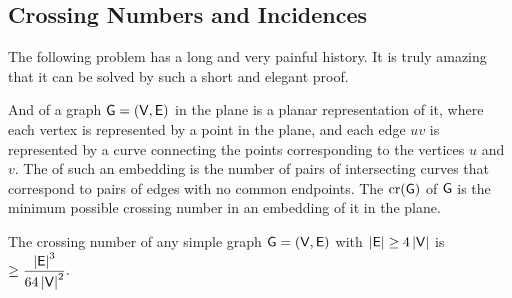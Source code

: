 \subsection{Crossing Numbers and Incidences}

The following problem has a long and very painful
history. It is truly amazing that it can be solved by such a
short and elegant proof. 

And  of a graph $\mathsf{G} = (\mathsf{V}, \mathsf{E})$ in the
plane is a planar representation of it, where each vertex is
represented by a point in the plane, and each edge $u v$ is
represented by a curve connecting the points corresponding to the
vertices $u$ and $v$. The  of such an embedding
is the number of pairs of intersecting curves that correspond to pairs
of edges with no common endpoints. The 
$\mathop{\mathrm{cr}}(\mathsf{G})$ of $\mathsf{G}$ is the minimum possible crossing number in
an embedding of it in the plane.

\begin{theorem}
    The crossing number of any simple graph $\mathsf{G} = (\mathsf{V},
    \mathsf{E})$ with $\left| {\mathsf{E}} \right| \geq 4 \left| {\mathsf{V}} \right|$ is
    \begin{math}\displaystyle
        \geq \frac{\left| {\mathsf{E}} \right|^3}{64\left| {\mathsf{V}} \right|^2}.
    \end{math}
\end{theorem}
 
